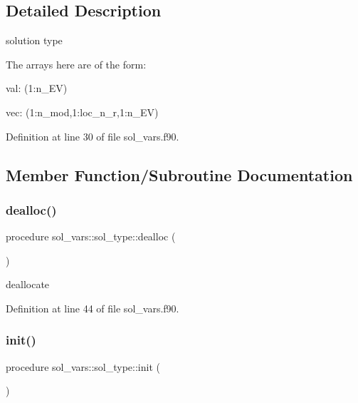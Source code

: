 \subsection{Detailed Description}
solution type 

The arrays here are of the form\+:
\begin{DoxyItemize}
\item {\ttfamily val\+:} {\ttfamily (1\+:n\+\_\+\+EV)}
\item {\ttfamily vec\+:} {\ttfamily (1\+:n\+\_\+mod,1\+:loc\+\_\+n\+\_\+r,1\+:n\+\_\+\+EV)} 
\end{DoxyItemize}

Definition at line 30 of file sol\+\_\+vars.\+f90.



\subsection{Member Function/\+Subroutine Documentation}
\mbox{\label{structsol__vars_1_1sol__type_a0501ba6efed7b97dcc3762a788caf826}} 
\subsubsection{\texorpdfstring{dealloc()}{dealloc()}}
{\footnotesize\ttfamily procedure sol\+\_\+vars\+::sol\+\_\+type\+::dealloc (\begin{DoxyParamCaption}{ }\end{DoxyParamCaption})}



deallocate 



Definition at line 44 of file sol\+\_\+vars.\+f90.

\mbox{\label{structsol__vars_1_1sol__type_a0963ae0c30f925b509a5da7e624ace84}} 
\subsubsection{\texorpdfstring{init()}{init()}}
{\footnotesize\ttfamily procedure sol\+\_\+vars\+::sol\+\_\+type\+::init (\begin{DoxyParamCaption}{ }\end{DoxyParamCaption})}



